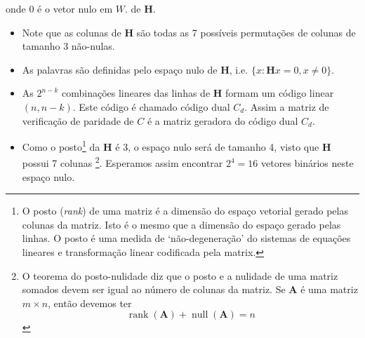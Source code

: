 \begin{frame}[allowframebreaks]
\begin{itemize}
{	onde $0$ é o vetor nulo em $W$.
	} de $\mathbf{H}$.
  \end{itemize}  
  \framebreak 
  \begin{itemize}
  \item Note que as colunas de $\mathbf{H}$ são todas as 7 possíveis permutações de colunas de tamanho 3 não-nulas.
  \item As palavras são definidas pelo espaço nulo de $\mathbf{H}$, i.e. $\{x : \mathbf{H}x = 0 , x \neq 0 \}$.
  \item As $2^{n-k}$ combinações lineares das linhas de $\mathbf{H}$ formam um código linear $(n,n-k)$. Este código é chamado código dual $C_d$. Assim a matriz de verificação de paridade de $C$ é a matriz geradora do código dual $C_d$.
  \item Como o posto\footnote{
	O posto (\textit{rank}) de uma matriz é a dimensão do espaço vetorial gerado pelas colunas da matriz. Isto
	é o mesmo que a dimensão do espaço gerado pelas linhas. O posto é uma medida de `não-degeneração' 
	do sistemas de equações lineares e transformação linear codificada pela matrix.
	} da $\mathbf{H}$ é 3, o espaço nulo será de tamanho 4, visto que $\mathbf{H}$ possui 7 colunas
	\footnote{
	O teorema do posto-nulidade diz que o posto e a nulidade de uma matriz somados devem ser igual ao número de colunas da matriz.
	Se $\mathbf{A}$ é uma matriz $m \times n$, então devemos ter
		\begin{equation}
		\operatorname{rank}(\mathbf{A}) + \operatorname{null}(\mathbf{A}) = n
		\end{equation}
	}. Esperamos assim encontrar $2^4 = 16$ vetores binários neste espaço nulo.
  \end{itemize}
\end{frame}

